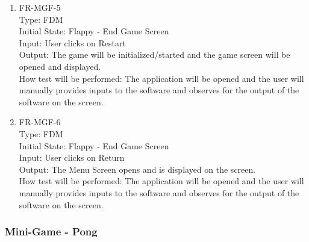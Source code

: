 \documentclass[12pt, titlepage]{article}
\begin{document}
\begin{enumerate}
\item{FR-MGF-5\\}
Type: FDM\\
Initial State: Flappy - End Game Screen\\
Input: User clicks on Restart\\
Output: The game will be initialized/started and the game screen will be opened and displayed.\\
How test will be performed: The application will be opened and the user will manually provides inputs to the software and observes for the output of the software on the screen.\\

\item{FR-MGF-6\\}
Type: FDM\\
Initial State: Flappy - End Game Screen\\
Input: User clicks on Return\\
Output: The Menu Screen opens and is displayed on the screen.\\
How test will be performed: The application will be opened and the user will manually provides inputs to the software and observes for the output of the software on the screen.\\
    
\end{enumerate}

\subsubsection{Mini-Game - Pong}
\end{document}

